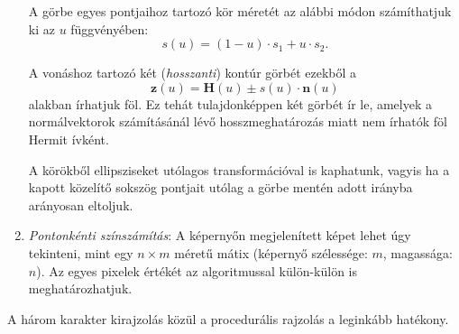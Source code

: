 \begin{enumerate}
A görbe egyes pontjaihoz tartozó kör méretét az alábbi módon számíthatjuk ki az $u$ függvényében:
$$
s(u) = (1 - u) \cdot s_1 + u \cdot s_2.
$$

A vonáshoz tartozó két (\textit{hosszanti}) kontúr görbét ezekből a
$$
\textbf{z}(u) = \textbf{H}(u) \pm s(u) \cdot \textbf{n}(u)
$$
alakban írhatjuk föl. Ez tehát tulajdonképpen két görbét ír le, amelyek a normálvektorok számításánál lévő hosszmeghatározás miatt nem írhatók föl Hermit ívként.

A körökből ellipsziseket utólagos transformációval is kaphatunk, vagyis ha a kapott közelítő sokszög pontjait utólag a görbe mentén adott irányba arányosan eltoljuk.

\item \textit{Pontonkénti színszámítás}: A képernyőn megjelenített képet lehet úgy tekinteni, mint egy $n \times m$ méretű mátix (képernyő szélessége: $m$, magassága: $n$). Az egyes pixelek értékét az algoritmussal külön-külön is meghatározhatjuk.

\end{enumerate}

A három karakter kirajzolás közül a procedurális rajzolás a leginkább hatékony.

